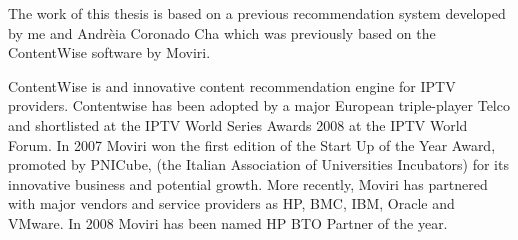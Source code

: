 The work of this thesis is based on a previous recommendation system developed by me and Andrèia Coronado Cha which was previously based on the ContentWise \cite{ContentWise} software by Moviri. 

ContentWise is and innovative content recommendation engine for IPTV providers. Contentwise has been adopted by a major European triple-player Telco and shortlisted at the IPTV World Series Awards 2008 at the IPTV World Forum.
In 2007 Moviri won the first edition of the Start Up of the Year Award, promoted by PNICube, (the Italian Association of Universities Incubators) for its innovative business and potential growth. More recently, Moviri has partnered with major vendors and service providers as HP, BMC, IBM, Oracle and VMware. In 2008 Moviri has been named HP BTO Partner of the year.     


